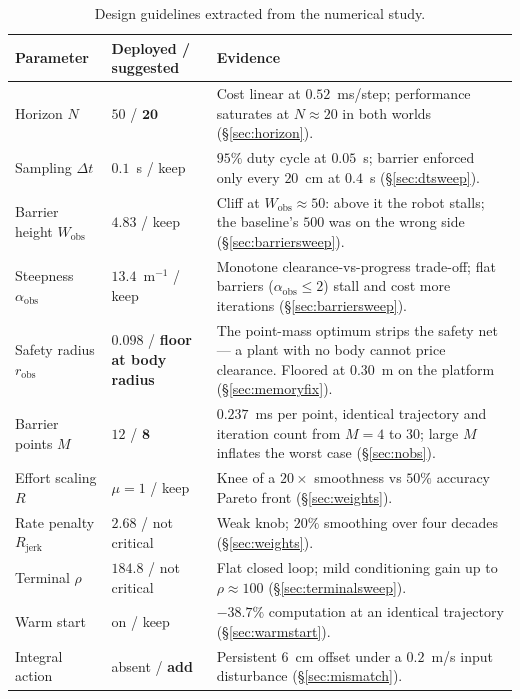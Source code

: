 \documentclass[11pt,a4paper]{article}
\newcommand{\Wobs}{W_{\mathrm{obs}}}
\newcommand{\aobs}{\alpha_{\mathrm{obs}}}
\newcommand{\robs}{r_{\mathrm{obs}}}
\newcommand{\Rjerk}{R_{\mathrm{jerk}}}
\begin{document}
\begin{table}[htbp]
  \centering
  \small
  \caption{Design guidelines extracted from the numerical study.}
  \label{tab:guidelines}
  \begin{tabular}{p{}p{}p{}}
    \toprule
    Parameter & Deployed / suggested & Evidence \\
    \midrule
    Horizon $N$ & $50$ / $\mathbf{20}$ & Cost linear at $0.52$~ms/step; performance saturates at
      $N\!\approx\!20$ in both worlds (\S\ref{sec:horizon}). \\
    Sampling $\Delta t$ & $0.1$~s / keep & $95\%$ duty cycle at $0.05$~s; barrier enforced only every
      $20$~cm at $0.4$~s (\S\ref{sec:dtsweep}). \\
    Barrier height $\Wobs$ & $4.83$ / keep & Cliff at $\Wobs\!\approx\!50$: above it the robot stalls; the
      baseline's $500$ was on the wrong side (\S\ref{sec:barriersweep}). \\
    Steepness $\aobs$ & $13.4$~m$^{-1}$ / keep & Monotone clearance-vs-progress trade-off; flat barriers
      ($\aobs\!\le\!2$) stall and cost more iterations (\S\ref{sec:barriersweep}). \\
    Safety radius $\robs$ & $0.098$ / \textbf{floor at body radius} & The point-mass optimum strips the
      safety net --- a plant with no body cannot price clearance. Floored at $0.30$~m on the platform
      (\S\ref{sec:memoryfix}). \\
    Barrier points $M$ & $12$ / $\mathbf{8}$ & $0.237$~ms per point, identical trajectory and iteration count
      from $M=4$ to $30$; large $M$ inflates the worst case (\S\ref{sec:nobs}). \\
    Effort scaling $R$ & $\mu=1$ / keep & Knee of a $20\times$ smoothness vs $50\%$ accuracy Pareto front
      (\S\ref{sec:weights}). \\
    Rate penalty $\Rjerk$ & $2.68$ / not critical & Weak knob; $20\%$ smoothing over four decades
      (\S\ref{sec:weights}). \\
    Terminal $\rho$ & $184.8$ / not critical & Flat closed loop; mild conditioning gain up to
      $\rho\!\approx\!100$ (\S\ref{sec:terminalsweep}). \\
    Warm start & on / keep & $-38.7\%$ computation at an identical trajectory (\S\ref{sec:warmstart}). \\
    Integral action & absent / \textbf{add} & Persistent $6$~cm offset under a $0.2$~m/s input disturbance
      (\S\ref{sec:mismatch}). \\

\end{tabular}
\end{table}
\end{document}
